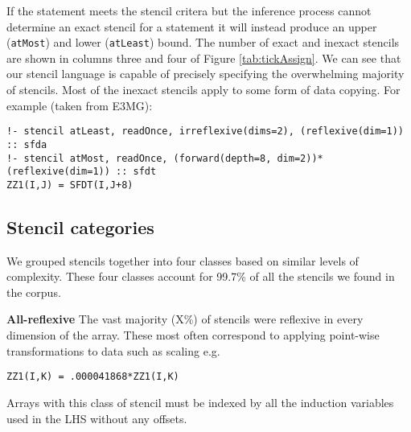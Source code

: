\documentclass[9pt]{sigplanconf}
\theoremstyle{definition}
\newcommand{\term}[1]{\texttt{#1}}
\begin{document}





If the statement meets the stencil critera but the inference process cannot determine an exact stencil for a statement it will instead produce an upper (\term{atMost}) and lower (\term{atLeast}) bound. The number of exact and inexact stencils are shown in columns three and four of Figure \ref{tab:tickAssign}. We can see that our stencil language is capable of precisely specifying the overwhelming majority of stencils. Most of the inexact stencils apply to some form of data copying. For example (taken from E3MG):
\begin{verbatim}
!- stencil atLeast, readOnce, irreflexive(dims=2), (reflexive(dim=1)) :: sfda
!- stencil atMost, readOnce, (forward(depth=8, dim=2))*(reflexive(dim=1)) :: sfdt
ZZ1(I,J) = SFDT(I,J+8)
\end{verbatim}

\subsection{Stencil categories}


We grouped stencils together into four classes based on similar levels of complexity. These four classes account for 99.7\% of all the stencils we found in the corpus.

\textbf{All-reflexive} The vast majority (X\%) of stencils were
reflexive in every dimension of the array. These most often correspond
to applying point-wise transformations to data such as scaling
e.g. \begin{verbatim}
ZZ1(I,K) = .000041868*ZZ1(I,K)
\end{verbatim}
Arrays with this class of stencil must be indexed by all the induction
variables used in the LHS without any offsets.
\end{document}
